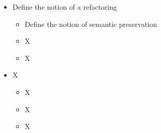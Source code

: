 \begin{itemize}

  \item Define the notion of a refactoring

        \begin{itemize}

          \item Define the notion of semantic preservation

          \item X

          \item X

        \end{itemize}

  \item X

        \begin{itemize}

          \item X

          \item X

          \item X

        \end{itemize}

\end{itemize}

